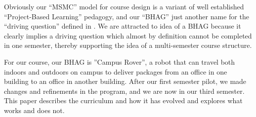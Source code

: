 Obviously our ``MSMC'' model for course design is a variant of well established ``Project-Based Learning'' pedagogy\cite{projects}, and our ``BHAG'' just another name for the ``driving question'' defined in \cite{blumenfeld}. We are attracted to idea of a BHAG because it clearly implies a driving question which almost by definition cannot be completed in one semester, thereby supporting the idea of a multi-semester course structure.

For our course, our BHAG is ''Campus Rover'', a robot that can travel both indoors and outdoors on campus to deliver packages from an office in one building to an office in another building. After our first semester pilot, we made changes and refinements in the program, and we are now in our third semester. This paper describes the curriculum and how it has evolved and explores what works and does not.

